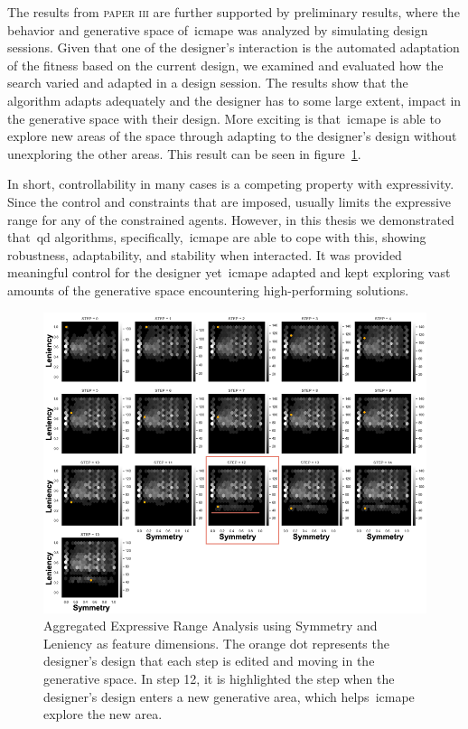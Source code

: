 The results from \textsc{paper iii} are further supported by preliminary results, where the behavior and generative space of~\acrshort{icmape} was analyzed by simulating design sessions. Given that one of the designer's interaction is the automated adaptation of the fitness based on the current design, we examined and evaluated how the search varied and adapted in a design session.
The results show that the algorithm adapts adequately and the designer has to some large extent, impact in the generative space with their design. More exciting is that~\acrshort{icmape} is able to explore new areas of the space through adapting to the designer's design without unexploring the other areas. This result can be seen in figure~\ref{fig:FigureRejectedPaper}. 

In short, controllability in many cases is a competing property with expressivity. Since the control and constraints that are imposed, usually limits the expressive range for any of the constrained agents. However, in this thesis we demonstrated that~\acrshort{qd} algorithms, specifically,~\acrshort{icmape} are able to cope with this, showing robustness, adaptability, and stability when interacted. It was provided meaningful control for the designer yet~\acrshort{icmape} adapted and kept exploring vast amounts of the generative space encountering high-performing solutions. 

\begin{figure}[t]
\centerline{\includegraphics[width=\textwidth]{figures/ICMAPE-figs/accumulative__X-sym-Y-len-2.png}}
\caption{Aggregated Expressive Range Analysis using Symmetry and Leniency as feature dimensions. The orange dot represents the designer's design that each step is edited and moving in the generative space. In step 12, it is highlighted the step when the designer's design enters a new generative area, which helps~\acrshort{icmape} explore the new area.}
\label{fig:FigureRejectedPaper}
\end{figure}

